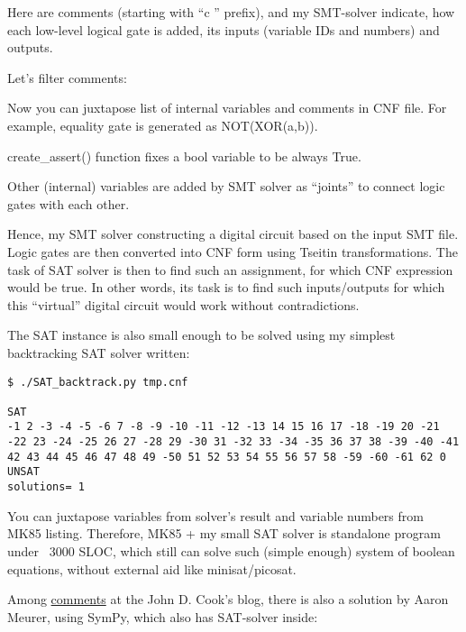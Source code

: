 Here are comments (starting with ``c '' prefix), and my SMT-solver indicate, how each low-level logical gate is added,
its inputs (variable IDs and numbers) and outputs.

Let's filter comments:



Now you can juxtapose list of internal variables and comments in CNF file.
For example, equality gate is generated as NOT(XOR(a,b)).

create\_assert() function fixes a bool variable to be always True.

Other (internal) variables are added by SMT solver as ``joints'' to connect logic gates with each other.

Hence, my SMT solver constructing a digital circuit based on the input SMT file.
Logic gates are then converted into CNF form using Tseitin transformations.
The task of SAT solver is then to find such an assignment, for which CNF expression would be true.
In other words, its task is to find such inputs/outputs for which this ``virtual'' digital circuit would work
without contradictions.

The SAT instance is also small enough to be solved using my simplest backtracking SAT solver written:

\begin{lstlisting}
$ ./SAT_backtrack.py tmp.cnf

SAT
-1 2 -3 -4 -5 -6 7 -8 -9 -10 -11 -12 -13 14 15 16 17 -18 -19 20 -21 -22 23 -24 -25 26 27 -28 29 -30 31 -32 33 -34 -35 36 37 38 -39 -40 -41 42 43 44 45 46 47 48 49 -50 51 52 53 54 55 56 57 58 -59 -60 -61 62 0
UNSAT
solutions= 1
\end{lstlisting}

You can juxtapose variables from solver's result and variable numbers from MK85 listing.
Therefore, MK85 + my small SAT solver is standalone program under ~3000 SLOC, which still can solve such (simple enough) system of boolean equations, without external aid like minisat/picosat.

\myhrule{}

Among \href{https://www.johndcook.com/blog/2015/07/06/multiple-choice/}{comments} at the John D. Cook's blog, there is also a solution by Aaron Meurer, using SymPy,
which also has SAT-solver inside:

